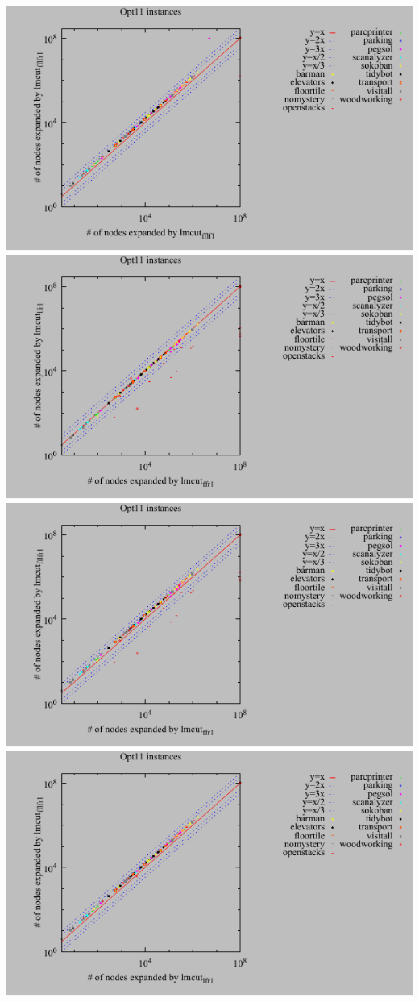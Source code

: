 \includegraphics{tables/opt11-expanded-lmcut_fflf-lmcut_fflfr.pdf}
\linebreak
\includegraphics{tables/opt11-expanded-lmcut_ffr-lmcut_lfr.pdf}
\linebreak
\includegraphics{tables/opt11-expanded-lmcut_ffr-lmcut_fflfr.pdf}
\linebreak
\includegraphics{tables/opt11-expanded-lmcut_lfr-lmcut_fflfr.pdf}
\linebreak
